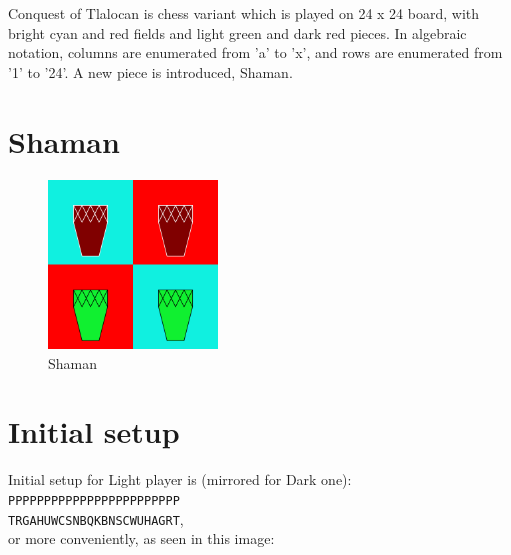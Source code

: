\documentclass[a5paper,12pt,draft]{book} %
\begin{document}
\noindent
Conquest of Tlalocan is chess variant which is played on 24 x 24 board,
with bright cyan and red fields and light green and dark red pieces.
In algebraic notation, columns are enumerated from 'a' to 'x', and rows
are enumerated from '1' to '24'. A new piece is introduced, Shaman.

\clearpage

\section*{Shaman}

\noindent
\begin{figure}
\includegraphics[width=0.4\textwidth, keepaspectratio=true]{../gfx/pieces/14_shaman.png}
\caption{Shaman}
\label{fig:shaman}
\end{figure}

\clearpage

\section*{Initial setup}

Initial setup for Light player is (mirrored for Dark one):
\texttt{PPPPPPPPPPPPPPPPPPPPPPPP \\
        TRGAHUWCSNBQKBNSCWUHAGRT}, \\
or more conveniently, as seen in this image:
\end{document}
